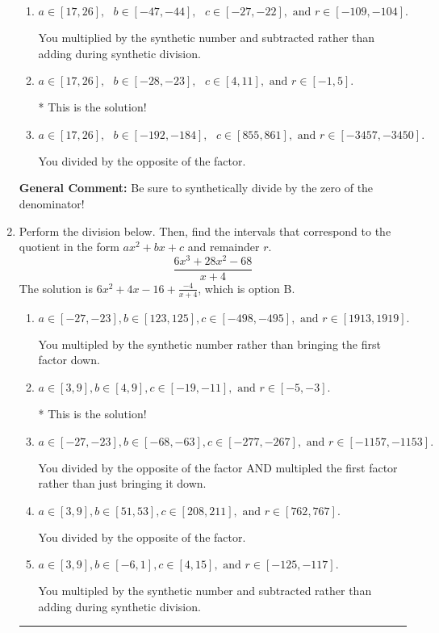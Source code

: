 \documentclass{extbook}[14pt]
\newcommand{\litem}[1]{\item #1

\rule{\textwidth}{0.4pt}}
\begin{document}
\begin{enumerate}
{\begin{enumerate}[label=\Alph*.]
 You multiplied by the synthetic number rather than bringing the first factor down.
\item \( a \in [17, 26], \text{   } b \in [-47, -44], \text{   } c \in [-27, -22], \text{   and   } r \in [-109, -104]. \)

 You multiplied by the synthetic number and subtracted rather than adding during synthetic division.
\item \( a \in [17, 26], \text{   } b \in [-28, -23], \text{   } c \in [4, 11], \text{   and   } r \in [-1, 5]. \)

* This is the solution!
\item \( a \in [17, 26], \text{   } b \in [-192, -184], \text{   } c \in [855, 861], \text{   and   } r \in [-3457, -3450]. \)

 You divided by the opposite of the factor.
\end{enumerate}

\textbf{General Comment:} Be sure to synthetically divide by the zero of the denominator!
}
\litem{
Perform the division below. Then, find the intervals that correspond to the quotient in the form $ax^2+bx+c$ and remainder $r$.
\[ \frac{6x^{3} +28 x^{2} -68}{x + 4} \]The solution is \( 6x^{2} +4 x -16 + \frac{-4}{x + 4} \), which is option B.\begin{enumerate}[label=\Alph*.]
\item \( a \in [-27, -23], b \in [123, 125], c \in [-498, -495], \text{ and } r \in [1913, 1919]. \)

 You multipled by the synthetic number rather than bringing the first factor down.
\item \( a \in [3, 9], b \in [4, 9], c \in [-19, -11], \text{ and } r \in [-5, -3]. \)

* This is the solution!
\item \( a \in [-27, -23], b \in [-68, -63], c \in [-277, -267], \text{ and } r \in [-1157, -1153]. \)

 You divided by the opposite of the factor AND multipled the first factor rather than just bringing it down.
\item \( a \in [3, 9], b \in [51, 53], c \in [208, 211], \text{ and } r \in [762, 767]. \)

 You divided by the opposite of the factor.
\item \( a \in [3, 9], b \in [-6, 1], c \in [4, 15], \text{ and } r \in [-125, -117]. \)

 You multipled by the synthetic number and subtracted rather than adding during synthetic division.
\end{enumerate}

}
\end{enumerate}
\end{document}
